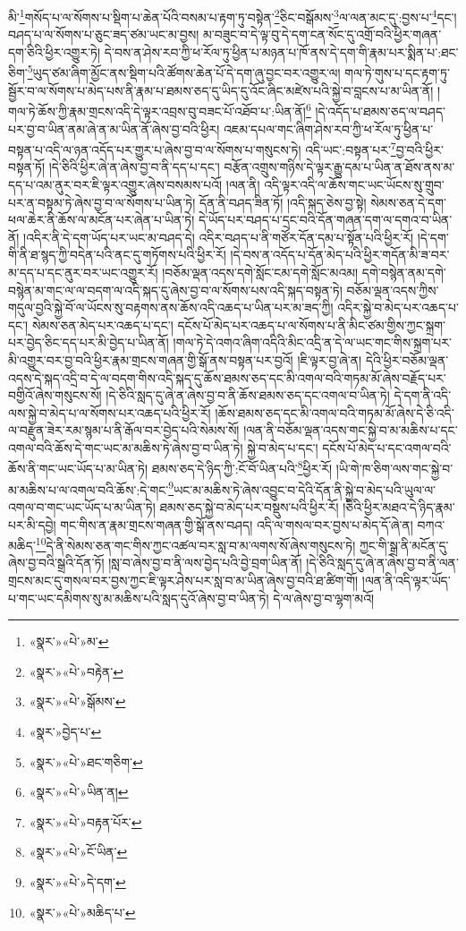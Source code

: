 མི་\footnote{«སྣར་»«པེ་»མ་}གསོད་པ་ལ་སོགས་པ་སྡིག་པ་ཆེན་པོའི་བསམ་པ་རྟག་ཏུ་བསྟེན་\footnote{«སྣར་»«པེ་»བརྟེན་}ཅིང་བསྒོམས་\footnote{«སྣར་»«པེ་»སྒོམས་}ལ་ལན་མང་དུ་:བྱས་པ་\footnote{«སྣར་»བྱེད་པ་}དང་། བཤད་པ་ལ་སོགས་པ་ཅུང་ཟད་ཙམ་ཡང་མ་བྱས། མ་བཟུང་བ་དེ་ལྟ་བུ་དེ་དག་ངན་སོང་དུ་འགྲོ་བའི་ཕྱིར་གཞན་དག་ཅིའི་ཕྱིར་འགྱུར་ཏེ། དེ་བས་ན་ཤེས་རབ་ཀྱི་ཕ་རོལ་ཏུ་ཕྱིན་པ་མཉན་པ་ཁོ་ནས་དེ་དག་གི་རྣམ་པར་སྨིན་པ་:ཐང་ཅིག་\footnote{«སྣར་»«པེ་»ཐང་གཅིག་}ཡུད་ཙམ་ཞིག་མྱོང་ནས་སྡིག་པའི་ཚོགས་ཆེན་པོ་དེ་དག་ཞུ་བྱང་བར་འགྱུར་ལ། གལ་ཏེ་གུས་པ་དང་རྟག་ཏུ་སྦྱོར་བ་ལ་སོགས་པ་མེད་པས་ནི་རྣམ་པ་ཐམས་ཅད་དུ་ཡིད་དུ་འོང་ཞིང་མཛེས་པའི་སྐྱེ་བ་བླངས་པ་མ་ཡིན་ནོ། །གལ་ཏེ་ཆོས་ཀྱི་རྣམ་གྲངས་འདི་དེ་ལྟར་འབྲས་བུ་བཟང་པོ་འཐོབ་པ་:ཡིན་ནོ།\footnote{«སྣར་»«པེ་»ཡིན་ན།} །དེ་འདོད་པ་ཐམས་ཅད་ལ་བཤད་པར་བྱ་བ་ཡིན་ནམ་ཞེ་ན་མ་ཡིན་ནོ་ཞེས་བྱ་བའི་ཕྱིར། འཇམ་དཔལ་གང་ཞིག་ཤེས་རབ་ཀྱི་ཕ་རོལ་ཏུ་ཕྱིན་པ་བསྟན་པ་འདི་ལ་ཉན་འདོད་པར་གྱུར་པ་ཞེས་བྱ་བ་ལ་སོགས་པ་གསུངས་ཏེ། འདི་ཡང་:བསྟན་པར་\footnote{«སྣར་»«པེ་»བརྟན་པོར་}བྱ་བའི་ཕྱིར་བསྟན་ཏོ། །དེ་ཅིའི་ཕྱིར་ཞེ་ན་ཞེས་བྱ་བ་ནི་དད་པ་དང་། བརྩོན་འགྲུས་གཉིས་དེ་ལྟར་རྒྱུ་དམ་པ་ཡིན་ན་ཐོས་ནས་མ་དད་པ་འམ་ནུར་བར་ཇི་ལྟར་འགྱུར་ཞེས་བསམས་པའོ། །ལན་ནི། འདི་ལྟར་འདི་ལ་ཆོས་གང་ཡང་ཡོངས་སུ་གྲུབ་པར་ན་བསྟམ་ཏེ་ཞེས་བྱ་བ་ལ་སོགས་པ་ཡིན་ཏེ། དོན་ནི་བཤད་ཟིན་ཏོ། །འདི་སྐད་ཅེས་བྱ་སྟེ། སེམས་ཅན་དེ་དག་ཕལ་ཆེར་ནི་ཆོས་ལ་མངོན་པར་ཞེན་པ་ཡིན་ཏེ། དེ་ཡོད་པར་བཤད་པ་དྲང་བའི་དོན་གཞན་དག་ལ་དགའ་བ་ཡིན་ནོ། །འདིར་ནི་དེ་དག་ཡོད་པར་ཡང་མ་བཤད་དེ། འདིར་བཤད་པ་ནི་གཙོར་དོན་དམ་པ་སྟོན་པའི་ཕྱིར་རོ། །དེ་དག་གི་ནི་ཐ་སྙད་ཀྱི་བདེན་པའི་ནང་དུ་གཏོགས་པའི་ཕྱིར་རོ། །དེ་བས་ན་འདོད་པ་དོན་མེད་པའི་ཕྱིར་གདོན་མི་ཟ་བར་མ་དད་པ་དང་ནུར་བར་ཡང་འགྱུར་རོ། །བཅོམ་ལྡན་འདས་དགེ་སློང་ངམ་དགེ་སློང་མའམ། དགེ་བསྙེན་ནམ་དགེ་བསྙེན་མ་གང་ལ་ལ་བདག་ལ་འདི་སྐད་དུ་ཞེས་བྱ་བ་ལ་སོགས་པས་འདི་སྐད་བསྟན་ཏེ། བཅོམ་ལྡན་འདས་ཀྱིས་གདུལ་བྱའི་སྐྱེ་བོ་ལ་ཡོངས་སུ་བརྟགས་ནས་ཆོས་འདི་འཆད་པ་ཡིན་པར་མ་ཟད་ཀྱི། འདིར་སྐྱེ་བ་མེད་པར་འཆད་པ་དང་། སེམས་ཅན་མེད་པར་འཆད་པ་དང་། དངོས་པོ་མེད་པར་འཆད་པ་ལ་སོགས་པ་ནི་མིང་ཙམ་གྱིས་ཀྱང་སྐྲག་པར་བྱེད་ཅིང་དད་པར་མི་བྱེད་པ་ཡིན་ནོ། །གལ་ཏེ་དེ་འགའ་ཞིག་འདིའི་མིང་འདྲི་ན་དེ་ལ་ཡང་གང་གིས་སྐྲག་པར་མི་འགྱུར་བར་བྱ་བའི་ཕྱིར་རྣམ་གྲངས་གཞན་གྱི་སྒོ་ནས་བསྟན་པར་བྱའོ། །ཇི་ལྟར་བྱ་ཞེ་ན། དེའི་ཕྱིར་བཅོམ་ལྡན་འདས་དེ་སྐད་འདྲི་བ་དེ་ལ་བདག་གིས་འདི་སྐད་དུ་ཆོས་ཐམས་ཅད་དང་མི་འགལ་བའི་གཏམ་མོ་ཞེས་བརྗོད་པར་བགྱིའོ་ཞེས་གསུངས་སོ། །དེ་ཅིའི་སླད་དུ་ཞེ་ན་ཞེས་བྱ་བ་ནི་ཆོས་ཐམས་ཅད་དང་འགལ་བ་ཡིན་ཏེ། དེ་དག་ནི་འདི་ལས་སྐྱེ་བ་མེད་པ་ལ་སོགས་པར་འཆད་པའི་ཕྱིར་རོ། །ཆོས་ཐམས་ཅད་དང་མི་འགལ་བའི་གཏམ་མོ་ཞེས་དེ་ཅི་འདི་ལ་བརྫུན་ཟེར་རམ་སྙམ་པ་ནི་རྒོལ་བར་བྱེད་པའི་སེམས་སོ། །ལན་ནི་བཅོམ་ལྡན་འདས་གང་སྐྱེ་བ་མ་མཆིས་པ་དང་འགལ་བའི་ཆོས་དེ་གང་ཡང་མ་མཆིས་ཏེ་ཞེས་བྱ་བ་ཡིན་ཏེ། སྐྱེ་བ་མེད་པ་དང་། དངོས་པོ་མེད་པ་དང་འགལ་བའི་ཆོས་ནི་གང་ཡང་ཡོད་པ་མ་ཡིན་ཏེ། ཐམས་ཅད་དེ་ཉིད་ཀྱི་:ངོ་བོ་ཡིན་པའི་\footnote{«སྣར་»«པེ་»ངོ་ཡིན་}ཕྱིར་རོ། །ཡི་གེ་ཁ་ཅིག་ལས་གང་སྐྱེ་བ་མ་མཆིས་པ་ལ་འགལ་བའི་ཆོས་:དེ་གང་\footnote{«སྣར་»«པེ་»དེ་དག་}ཡང་མ་མཆིས་ཏེ་ཞེས་འབྱུང་བ་དེའི་དོན་ནི་སྐྱེ་བ་མེད་པའི་ཡུལ་ལ་འགལ་བ་གང་ཡང་ཡོད་པ་མ་ཡིན་ཏེ། ཐམས་ཅད་སྐྱེ་བ་མེད་པར་བསྡུས་པའི་ཕྱིར་རོ། །ཅིའི་ཕྱིར་མཐའ་དེ་ཉིད་རྣམ་པར་མི་དབྱེ། གང་གིས་ན་རྣམ་གྲངས་གཞན་གྱི་སྒོ་ནས་བཤད། འདི་ལ་གསལ་བར་བྱས་པ་མེད་དོ་ཞེ་ན། བཀའ་མཆིད་\footnote{«སྣར་»«པེ་»མཆིད་པ་}དེ་ནི་སེམས་ཅན་གང་གིས་ཀྱང་འཚལ་བར་སླ་བ་མ་ལགས་སོ་ཞེས་གསུངས་ཏེ། ཀྱང་གི་སྒྲ་ནི་མངོན་དུ་ཞེས་བྱ་བའི་སྒྲའི་དོན་ཏོ། །སླ་བ་ཞེས་བྱ་བ་ནི་ལས་བྱེད་པའི་བྱེ་བྲག་ཡིན་ནོ། །དེ་ཅིའི་སླད་དུ་ཞེ་ན་ཞེས་བྱ་བ་ནི་ལན་གྲངས་མང་དུ་གསལ་བར་བྱས་ཀྱང་ཇི་ལྟར་ཤེས་པར་སླ་བ་མ་ཡིན་ཞེས་བྱ་བའི་ཐ་ཚིག་གོ། །ལན་ནི་འདི་ལྟར་ཡོད་པ་གང་ཡང་དམིགས་སུ་མ་མཆིས་པའི་སླད་དུའོ་ཞེས་བྱ་བ་ཡིན་ཏེ། དེ་ལ་ཞེས་བྱ་བ་ལྷག་མའོ། 